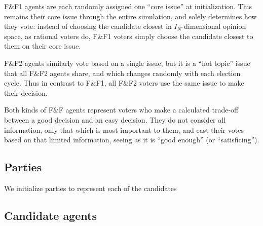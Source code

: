F\&F1 agents are each randomly assigned one ``core issue'' at initialization.
This remains their core issue through the entire simulation, and solely
determines how they vote: instead of choosing the candidate closest in
$I_N$-dimensional opinion space, as rational voters do, F\&F1 voters simply
choose the candidate closest to them on their core issue.

F\&F2 agents similarly vote based on a single issue, but it is a ``hot topic''
issue that all F\&F2 agents share, and which changes randomly with each
election cycle. Thus in contrast to F\&F1, all F\&F2 voters use the same issue
to make their decision.

Both kinds of F\&F agents represent voters who make a calculated trade-off
between a good decision and an easy decision. They do not consider all
information, only that which is most important to them, and cast their votes
based on that limited information, seeing as it is ``good enough'' (or
``satisficing''\cite{simon_rational_1956}).


\subsection{Parties}


We initialize parties to represent each of the candidates

\subsection{Candidate agents}


